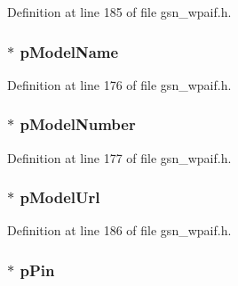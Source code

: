 Definition at line 185 of file gsn\_\-wpaif.h.

\hypertarget{a00427_a5466054ddbc5ae79c989aa024d95d5b1}{
\subsubsection[{pModelName}]{$\ast$ {\bf pModelName}}}
\label{a00427_a5466054ddbc5ae79c989aa024d95d5b1}


Definition at line 176 of file gsn\_\-wpaif.h.

\hypertarget{a00427_a8cf499260c5308598ec0ebf2833648eb}{
\subsubsection[{pModelNumber}]{$\ast$ {\bf pModelNumber}}}
\label{a00427_a8cf499260c5308598ec0ebf2833648eb}


Definition at line 177 of file gsn\_\-wpaif.h.

\hypertarget{a00427_ae906a1a75e7b52847010abf2788dfb68}{
\subsubsection[{pModelUrl}]{$\ast$ {\bf pModelUrl}}}
\label{a00427_ae906a1a75e7b52847010abf2788dfb68}


Definition at line 186 of file gsn\_\-wpaif.h.

\hypertarget{a00427_a09fc73c85af39fd4a7fe59a7be642f62}{
\subsubsection[{pPin}]{$\ast$ {\bf pPin}}}
\label{a00427_a09fc73c85af39fd4a7fe59a7be642f62}


